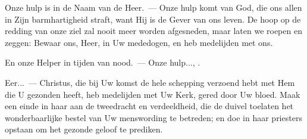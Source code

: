 \documentclass[12pt,twoside,a5paper]{article}
\begin{document}

\begin{halfparskip}
  Onze hulp is in de Naam van de Heer.~--- Onze hulp komt van God, die ons allen in Zijn barmhartigheid straft, want Hij is de Gever van ons leven. De hoop op de redding van onze ziel zal nooit meer worden afgesneden, maar laten we roepen en zeggen: Bewaar ons, Heer, in Uw mededogen, en heb medelijden met ons.

  En onze Helper in tijden van nood.~--- Onze hulp..., .

  Eer...~--- Christus, die bij Uw komst de hele schepping verzoend hebt met Hem die U gezonden heeft, heb medelijden met Uw Kerk, gered door Uw bloed. Maak een einde in haar aan de tweedracht en verdeeldheid, die de duivel toelaten het wonderbaarlijke bestel van Uw menswording te betreden; en doe in haar priesters opstaan om het gezonde geloof te prediken.
\end{halfparskip}

\end{document}
